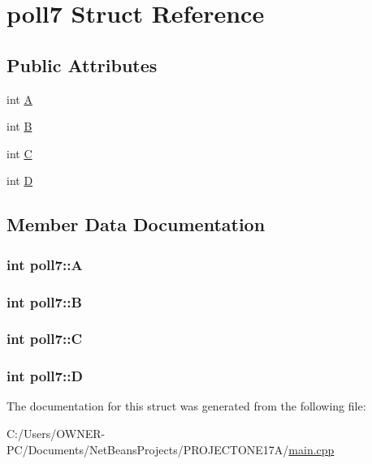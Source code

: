 \hypertarget{structpoll7}{\section{poll7 Struct Reference}
\label{structpoll7}
}
\subsection*{Public Attributes}
\begin{DoxyCompactItemize}
\item 
int \hyperlink{structpoll7_a4e4f344aa75e32d0d2374a485c898ede}{A}
\item 
int \hyperlink{structpoll7_a79717fae59d5fa68a231f801e6ef24dc}{B}
\item 
int \hyperlink{structpoll7_aef18d5e6e97e41df1980f0ef8f9001c1}{C}
\item 
int \hyperlink{structpoll7_a0883369c8ded8662c5600deea4f4315e}{D}
\end{DoxyCompactItemize}


\subsection{Member Data Documentation}
\hypertarget{structpoll7_a4e4f344aa75e32d0d2374a485c898ede}{
\subsubsection[{A}]{\setlength{\rightskip}{0pt plus 5cm}int poll7\+::\+A}}\label{structpoll7_a4e4f344aa75e32d0d2374a485c898ede}
\hypertarget{structpoll7_a79717fae59d5fa68a231f801e6ef24dc}{
\subsubsection[{B}]{\setlength{\rightskip}{0pt plus 5cm}int poll7\+::\+B}}\label{structpoll7_a79717fae59d5fa68a231f801e6ef24dc}
\hypertarget{structpoll7_aef18d5e6e97e41df1980f0ef8f9001c1}{
\subsubsection[{C}]{\setlength{\rightskip}{0pt plus 5cm}int poll7\+::\+C}}\label{structpoll7_aef18d5e6e97e41df1980f0ef8f9001c1}
\hypertarget{structpoll7_a0883369c8ded8662c5600deea4f4315e}{
\subsubsection[{D}]{\setlength{\rightskip}{0pt plus 5cm}int poll7\+::\+D}}\label{structpoll7_a0883369c8ded8662c5600deea4f4315e}


The documentation for this struct was generated from the following file\+:\begin{DoxyCompactItemize}
\item 
C\+:/\+Users/\+O\+W\+N\+E\+R-\/\+P\+C/\+Documents/\+Net\+Beans\+Projects/\+P\+R\+O\+J\+E\+C\+T\+O\+N\+E17\+A/\hyperlink{main_8cpp}{main.\+cpp}\end{DoxyCompactItemize}
